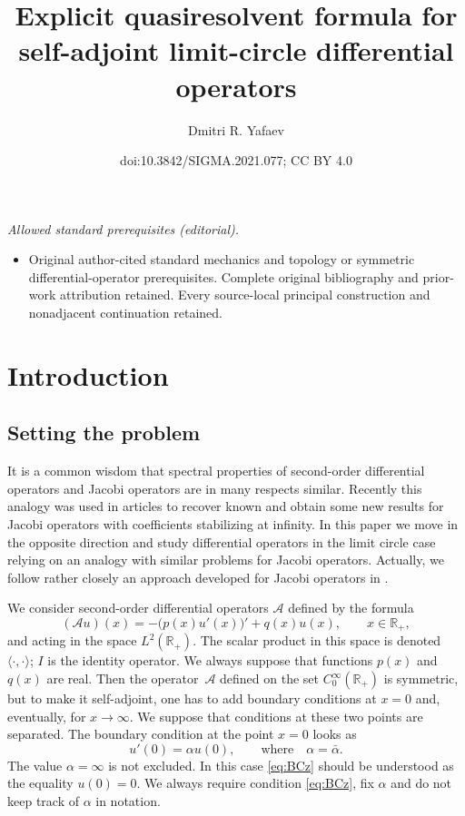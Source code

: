 \documentclass[10pt,a4paper]{amsart}
\title{Explicit quasiresolvent formula for self-adjoint limit-circle differential operators}
\author{Dmitri R. Yafaev}
\date{doi:10.3842/SIGMA.2021.077; CC BY 4.0}
\numberwithin{equation}{section}
\begin{document}
\maketitle
\noindent\textit{Allowed standard prerequisites (editorial).}\begin{itemize}
\item Original author-cited standard mechanics and topology or symmetric differential-operator prerequisites. Complete original bibliography and prior-work attribution retained. Every source-local principal construction and nonadjacent continuation retained.
\end{itemize}\medskip
\section{Introduction}

\subsection{Setting the problem}

It is a common wisdom that spectral properties of second-order differential operators and Jacobi operators are in many respects similar. Recently this analogy was used in articles \cite{Y/LD, JLR} to recover known and obtain some new results for
Jacobi operators with coefficients stabilizing at infinity. In this paper we move in the opposite direction and study
differential operators in the limit circle case relying on an analogy with similar problems for Jacobi operators.
Actually, we follow rather closely an approach developed for Jacobi operators in \cite{Jacobi-LC}.

We consider second-order differential operators ${\mathcal A}$ defined by the formula
 \begin{equation}
( {\mathcal A} u)(x)=- \big(p(x) u' (x)\big)' + q(x) u(x) ,\qquad x\in {\mathbb R}_{+},
 \label{eq:ZP+}\end{equation}
 and acting in
 the space $L^2 ({\mathbb R}_{+})$. The scalar product in this space is denoted $\langle \cdot, \cdot\rangle$; $I$ is the identity operator. We always suppose that functions $p(x)$ and $q(x)$ are real. Then the opera\-tor~${\mathcal A}$ defined on the set $ C_{0} ^\infty ({\mathbb R}_{+}) $ is symmetric, but to make it self-adjoint, one has to add boundary conditions at $x=0$ and, eventually, for $x\to\infty$. We suppose that conditions at these two points are separated. The boundary condition at the point $x=0$ looks as
 \begin{equation} \label{eq:BCz}
u'(0)= \alpha u(0), \qquad\mbox{where}\quad \alpha =\bar{\alpha}.
 \end{equation}
 The value $\alpha=\infty$ is not excluded. In this case \eqref{eq:BCz} should be understood as the equality $u(0)=0$. We always require condition \eqref{eq:BCz}, fix $\alpha$ and do not keep track of $\alpha$ in notation.
\end{document}

